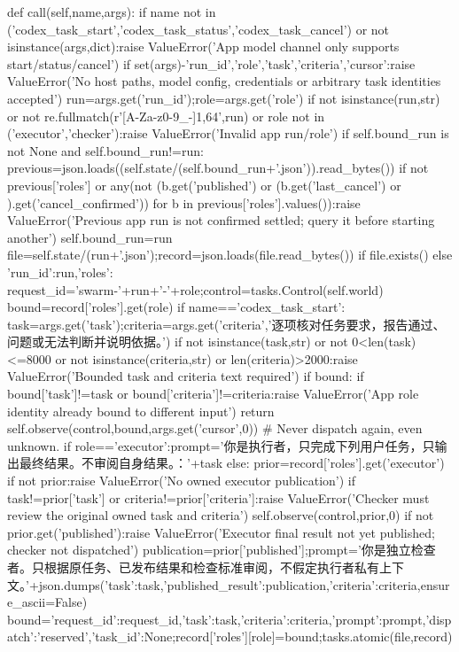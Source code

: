  def call(self,name,args):
  if name not in ('codex_task_start','codex_task_status','codex_task_cancel') or not isinstance(args,dict):raise ValueError('App model channel only supports start/status/cancel')
  if set(args)-{'run_id','role','task','criteria','cursor'}:raise ValueError('No host paths, model config, credentials or arbitrary task identities accepted')
  run=args.get('run_id');role=args.get('role')
  if not isinstance(run,str) or not re.fullmatch(r'[A-Za-z0-9_-]{1,64}',run) or role not in ('executor','checker'):raise ValueError('Invalid app run/role')
  if self.bound_run is not None and self.bound_run!=run:
   previous=json.loads((self.state/(self.bound_run+'.json')).read_bytes())
   if not previous['roles'] or any(not (b.get('published') or (b.get('last_cancel') or {}).get('cancel_confirmed')) for b in previous['roles'].values()):raise ValueError('Previous app run is not confirmed settled; query it before starting another')
  self.bound_run=run
  file=self.state/(run+'.json');record=json.loads(file.read_bytes()) if file.exists() else {'run_id':run,'roles':{}}
  request_id='swarm-'+run+'-'+role;control=tasks.Control(self.world)
  bound=record['roles'].get(role)
  if name=='codex_task_start':
   task=args.get('task');criteria=args.get('criteria','逐项核对任务要求，报告通过、问题或无法判断并说明依据。')
   if not isinstance(task,str) or not 0<len(task)<=8000 or not isinstance(criteria,str) or len(criteria)>2000:raise ValueError('Bounded task and criteria text required')
   if bound:
    if bound['task']!=task or bound['criteria']!=criteria:raise ValueError('App role identity already bound to different input')
    return self.observe(control,bound,args.get('cursor',0)) # Never dispatch again, even unknown.
   if role=='executor':prompt='你是执行者，只完成下列用户任务，只输出最终结果。不审阅自身结果。：'+task
   else:
    prior=record['roles'].get('executor')
    if not prior:raise ValueError('No owned executor publication')
    if task!=prior['task'] or criteria!=prior['criteria']:raise ValueError('Checker must review the original owned task and criteria')
    self.observe(control,prior,0)
    if not prior.get('published'):raise ValueError('Executor final result not yet published; checker not dispatched')
    publication=prior['published'];prompt='你是独立检查者。只根据原任务、已发布结果和检查标准审阅，不假定执行者私有上下文。\n'+json.dumps({'task':task,'published_result':publication,'criteria':criteria},ensure_ascii=False)
   bound={'request_id':request_id,'task':task,'criteria':criteria,'prompt':prompt,'dispatch':'reserved','task_id':None};record['roles'][role]=bound;tasks.atomic(file,record)
